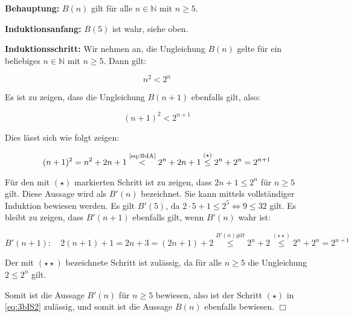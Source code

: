 \documentclass[a4paper,10pt]{scrartcl}
\begin{document}
\begin{enumerate}
\begin{enumerate}
                \textbf{Behauptung:} $B(n)$ gilt für alle $n \in \mathbb{N}$ mit $n \geq 5$.

                \textbf{Induktionsanfang:} $B(5)$ ist wahr, siehe oben.

                \textbf{Induktionsschritt:} Wir nehmen an, die Ungleichung $B(n)$ gelte für ein beliebiges $n \in \mathbb{N}$ mit $n \geq 5$. Dann gilt:

                \begin{equation}\label{eq:3bIA}\tag{IA}
                    n^2 < 2^n
                \end{equation}

                Es ist zu zeigen, dass die Ungleichung $B(n + 1)$ ebenfalls gilt, also:

                \begin{equation}\label{eq:3bIS1}
                    (n+1)^2 < 2^{n+1}
                \end{equation}

                Dies lässt sich wie folgt zeigen:

                \begin{equation}\label{eq:3bIS2}
                    (n+1)^2 = n^2 + 2n + 1 \overset{\text{\scriptsize\eqref{eq:3bIA}}}{<} 2^n + 2n + 1 \overset{(\star)}{\leq} 2^n + 2^n = 2^{n+1}
                \end{equation}

                Für den mit $(\star)$ markierten Schritt ist zu zeigen, dass $2n + 1 \leq 2^n$ für $n \geq 5$ gilt. Diese Aussage wird
                als $B'(n)$ bezeichnet. Sie kann mittels vollständiger Induktion bewiesen werden. Es gilt $B'(5)$, da
                $2 \cdot 5 + 1 \leq 2^5 \Leftrightarrow 9 \leq 32$ gilt. Es bleibt zu zeigen, dass $B'(n+1)$ ebenfalls gilt, wenn $B'(n)$
                wahr ist:

                \begin{equation}\label{eq:3bIS3}
                    B'(n + 1): \hspace{1em}
                    2(n + 1) + 1 = 2n + 3 = (2n + 1) + 2 \overset{B'(n) gilt}{\leq} 2^n + 2 \overset{(\star\star)}{\leq} 2^n + 2^n = 2^{n+1}
                \end{equation}

                Der mit $(\star\star)$ bezeichnete Schritt ist zulässig, da für alle $n \geq 5$ die Ungleichung $2 \leq 2^n$ gilt.

                Somit ist die Aussage $B'(n)$ für $n \geq 5$ bewiesen, also ist der Schritt $(\star)$ in \eqref{eq:3bIS2}
                zulässig, und somit ist die Aussage $B(n)$ ebenfalls bewiesen. $\Box$


\end{enumerate}
\end{enumerate}
\end{document}
